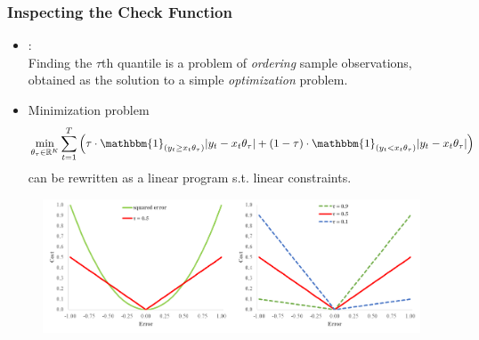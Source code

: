 \documentclass[xcolor=dvipsnames, xcolor=table, 10pt]{beamer}
\begin{document}
\begin{frame}
\frametitle{Inspecting the Check Function}
\label{checkfct}
  \vspace{0.25cm}
  \begin{itemize}
    \item \citet{koenker_2005}:\\ \medskip Finding the $\tau$th  quantile is a problem of \emph{ordering} sample observations, obtained as the solution to a simple \emph{optimization} problem.
        \bigskip
    \item Minimization problem
    \begin{equation*}
\min_{\theta_{\tau} \in \mathbb{R}^K} \sum_{t=1}^{T} \left(\tau \cdot \mathbbm{1}_{(y_{t}\geq x_t\theta_{\tau})} \lvert y_{t} - x_t \theta_{\tau} \rvert + (1-\tau) \cdot \mathbbm{1}_{(y_{t} < x_t \theta_{\tau})} \lvert y_{t} - x_t \theta_{\tau} \rvert \right)
\end{equation*}
can be rewritten as a linear program s.t. linear constraints.
  \end{itemize}
\begin{figure}[!htb]
 \centering
 \includegraphics[width=0.75\linewidth]{Figures/quantile_reg_v2}
 \end{figure}

\end{frame}


\end{document}
